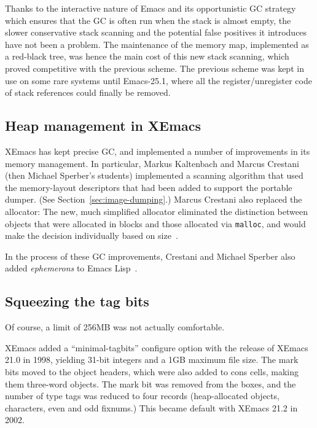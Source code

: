 \documentclass[format=acmsmall, review]{acmart}
\newcommand \Elisp {Emacs Lisp}
\begin{document}
Thanks to the interactive nature of Emacs and its opportunistic GC strategy
which ensures that the GC is often run when the stack is almost empty, the
slower conservative stack scanning and the potential false positives it
introduces have not been a problem.  The maintenance of the memory map,
implemented as a red-black tree, was hence the main cost of this new stack
scanning, which proved competitive with the previous scheme.  The previous
scheme was kept in use on some rare systems until Emacs-25.1, where all the
register/unregister code of stack references could finally be removed.

\subsection{Heap management in XEmacs}
\label{sec:heap-xemacs}

XEmacs has kept precise GC, and implemented a number of improvements
in its memory management.  In particular, Markus Kaltenbach and Marcus
Crestani (then Michael Sperber's students)
implemented a scanning algorithm that used the memory-layout
descriptors that had been added to support the portable dumper.  (See
Section~\ref{sec:image-dumping}.)  Marcus Crestani also replaced the
allocator: The new, much simplified allocator eliminated the
distinction between objects that were allocated in blocks and those
allocated via \texttt{malloc}, and would make the decision
individually based on size~\cite{Crestani2005}.

In the process of these GC improvements, Crestani and Michael Sperber
also added \emph{ephemerons} to \Elisp{}~\cite{Hayes1997}.

\subsection{Squeezing the tag bits}
\label{sec:tag-bits}

Of course, a limit of 256\;MB was not actually comfortable.

XEmacs added a ``minimal-tagbits'' configure option with the release
of XEmacs 21.0 in 1998, yielding 31-bit integers and a 1GB maximum
file size.  The mark bits moved to the object headers, which were also
added to cons cells, making them three-word objects.
The mark bit was removed from the boxes, and the number of
type tags was reduced to four records (heap-allocated objects,
characters, even and odd fixnums.)  This became default with XEmacs
21.2 in 2002.
\end{document}
